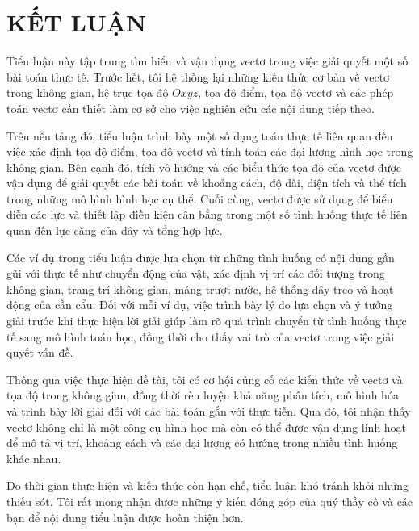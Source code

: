 \documentclass[12pt,a4paper,oneside]{book}
\theoremstyle{theorem}
\theoremstyle{definition}
\begin{document}
	\fontsize{13pt}{18pt}\selectfont %
	\setlength{\baselineskip}{26truept}
	\pagestyle{empty}

              
    \chapter*{KẾT LUẬN}


        Tiểu luận này tập trung tìm hiểu và vận dụng vectơ trong việc giải quyết một số bài toán thực tế. Trước hết, tôi hệ thống lại những kiến thức cơ bản về vectơ trong không gian, hệ trục tọa độ $Oxyz$, tọa độ điểm, tọa độ vectơ và các phép toán vectơ cần thiết làm cơ sở cho việc nghiên cứu các nội dung tiếp theo.
        
        Trên nền tảng đó, tiểu luận trình bày một số dạng toán thực tế liên quan đến việc xác định tọa độ điểm, tọa độ vectơ và tính toán các đại lượng hình học trong không gian. Bên cạnh đó, tích vô hướng và các biểu thức tọa độ của vectơ được vận dụng để giải quyết các bài toán về khoảng cách, độ dài, diện tích và thể tích trong những mô hình hình học cụ thể. Cuối cùng, vectơ được sử dụng để biểu diễn các lực và thiết lập điều kiện cân bằng trong một số tình huống thực tế liên quan đến lực căng của dây và tổng hợp lực.
        
        Các ví dụ trong tiểu luận được lựa chọn từ những tình huống có nội dung gần gũi với thực tế như chuyển động của vật, xác định vị trí các đối tượng trong không gian, trang trí không gian, máng trượt nước, hệ thống dây treo và hoạt động của cần cẩu. Đối với mỗi ví dụ, việc trình bày lý do lựa chọn và ý tưởng giải trước khi thực hiện lời giải giúp làm rõ quá trình chuyển từ tình huống thực tế sang mô hình toán học, đồng thời cho thấy vai trò của vectơ trong việc giải quyết vấn đề.
        
        Thông qua việc thực hiện đề tài, tôi có cơ hội củng cố các kiến thức về vectơ và tọa độ trong không gian, đồng thời rèn luyện khả năng phân tích, mô hình hóa và trình bày lời giải đối với các bài toán gắn với thực tiễn. Qua đó, tôi nhận thấy vectơ không chỉ là một công cụ hình học mà còn có thể được vận dụng linh hoạt để mô tả vị trí, khoảng cách và các đại lượng có hướng trong nhiều tình huống khác nhau.
        
        Do thời gian thực hiện và kiến thức còn hạn chế, tiểu luận khó tránh khỏi những thiếu sót. Tôi rất mong nhận được những ý kiến đóng góp của quý thầy cô và các bạn để nội dung tiểu luận được hoàn thiện hơn.
\end{document}
